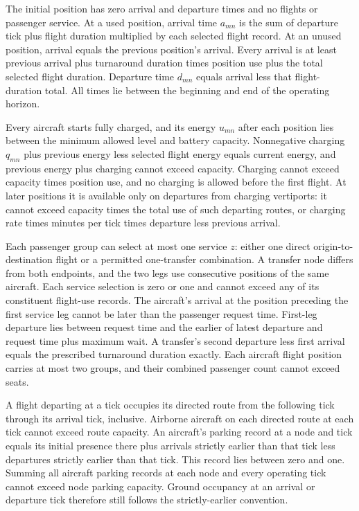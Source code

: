 \documentclass[10pt]{article}
\begin{document}
The initial position has zero arrival and departure times and no flights or passenger service. At a used position, arrival time $a_{mn}$ is the sum of departure tick plus flight duration multiplied by each selected flight record. At an unused position, arrival equals the previous position's arrival. Every arrival is at least previous arrival plus turnaround duration times position use plus the total selected flight duration. Departure time $d_{mn}$ equals arrival less that flight-duration total. All times lie between the beginning and end of the operating horizon.

Every aircraft starts fully charged, and its energy $u_{mn}$ after each position lies between the minimum allowed level and battery capacity. Nonnegative charging $q_{mn}$ plus previous energy less selected flight energy equals current energy, and previous energy plus charging cannot exceed capacity. Charging cannot exceed capacity times position use, and no charging is allowed before the first flight. At later positions it is available only on departures from charging vertiports: it cannot exceed capacity times the total use of such departing routes, or charging rate times minutes per tick times departure less previous arrival.

Each passenger group can select at most one service $z$: either one direct origin-to-destination flight or a permitted one-transfer combination. A transfer node differs from both endpoints, and the two legs use consecutive positions of the same aircraft. Each service selection is zero or one and cannot exceed any of its constituent flight-use records. The aircraft's arrival at the position preceding the first service leg cannot be later than the passenger request time. First-leg departure lies between request time and the earlier of latest departure and request time plus maximum wait. A transfer's second departure less first arrival equals the prescribed turnaround duration exactly. Each aircraft flight position carries at most two groups, and their combined passenger count cannot exceed seats.

A flight departing at a tick occupies its directed route from the following tick through its arrival tick, inclusive. Airborne aircraft on each directed route at each tick cannot exceed route capacity. An aircraft's parking record at a node and tick equals its initial presence there plus arrivals strictly earlier than that tick less departures strictly earlier than that tick. This record lies between zero and one. Summing all aircraft parking records at each node and every operating tick cannot exceed node parking capacity. Ground occupancy at an arrival or departure tick therefore still follows the strictly-earlier convention.
\end{document}
